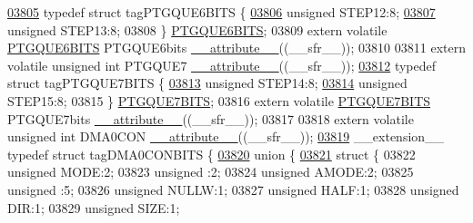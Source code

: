 \begin{DoxyCode}
\hypertarget{a00015_source_l03805}{}\hyperlink{a00014}{03805} \textcolor{keyword}{typedef} \textcolor{keyword}{struct }tagPTGQUE6BITS \{
\hypertarget{a00015_source_l03806}{}\hyperlink{a00014_af44a23d1cc0fa3fda040f9bff8cc19d1}{03806}   \textcolor{keywordtype}{unsigned} STEP12:8;
\hypertarget{a00015_source_l03807}{}\hyperlink{a00014_abdd685ca7ac89002c1130e1e0e8a37b9}{03807}   \textcolor{keywordtype}{unsigned} STEP13:8;
03808 \} \hyperlink{a00014_d5/d39/a00676}{PTGQUE6BITS};
03809 \textcolor{keyword}{extern} \textcolor{keyword}{volatile} \hyperlink{a00014_d5/d39/a00676}{PTGQUE6BITS} PTGQUE6bits \hyperlink{a00015_a493c46f03454991ccc5aa7a6e1dfb2a7}{\_\_attribute\_\_}((\_\_sfr\_\_));
03810 
03811 \textcolor{keyword}{extern} \textcolor{keyword}{volatile} \textcolor{keywordtype}{unsigned} \textcolor{keywordtype}{int}  PTGQUE7 \hyperlink{a00015_a493c46f03454991ccc5aa7a6e1dfb2a7}{\_\_attribute\_\_}((\_\_sfr\_\_));
\hypertarget{a00015_source_l03812}{}\hyperlink{a00014}{03812} \textcolor{keyword}{typedef} \textcolor{keyword}{struct }tagPTGQUE7BITS \{
\hypertarget{a00015_source_l03813}{}\hyperlink{a00014_a0e81977fa000fc2b0128943efe2fc72a}{03813}   \textcolor{keywordtype}{unsigned} STEP14:8;
\hypertarget{a00015_source_l03814}{}\hyperlink{a00014_a5d5ba25c4dd4a3183ec8fc7ed9a786fe}{03814}   \textcolor{keywordtype}{unsigned} STEP15:8;
03815 \} \hyperlink{a00014_dc/de4/a00677}{PTGQUE7BITS};
03816 \textcolor{keyword}{extern} \textcolor{keyword}{volatile} \hyperlink{a00014_dc/de4/a00677}{PTGQUE7BITS} PTGQUE7bits \hyperlink{a00015_a493c46f03454991ccc5aa7a6e1dfb2a7}{\_\_attribute\_\_}((\_\_sfr\_\_));
03817 
03818 \textcolor{keyword}{extern} \textcolor{keyword}{volatile} \textcolor{keywordtype}{unsigned} \textcolor{keywordtype}{int}  DMA0CON \hyperlink{a00015_a493c46f03454991ccc5aa7a6e1dfb2a7}{\_\_attribute\_\_}((\_\_sfr\_\_));
\hypertarget{a00015_source_l03819}{}\hyperlink{a00014}{03819} \_\_extension\_\_ \textcolor{keyword}{typedef} \textcolor{keyword}{struct }tagDMA0CONBITS \{
\hypertarget{a00015_source_l03820}{}\hyperlink{a00015}{03820}   \textcolor{keyword}{union }\{
\hypertarget{a00015_source_l03821}{}\hyperlink{a00015}{03821}     \textcolor{keyword}{struct }\{
03822       \textcolor{keywordtype}{unsigned} MODE:2;
03823       \textcolor{keywordtype}{unsigned} :2;
03824       \textcolor{keywordtype}{unsigned} AMODE:2;
03825       \textcolor{keywordtype}{unsigned} :5;
03826       \textcolor{keywordtype}{unsigned} NULLW:1;
03827       \textcolor{keywordtype}{unsigned} HALF:1;
03828       \textcolor{keywordtype}{unsigned} DIR:1;
03829       \textcolor{keywordtype}{unsigned} SIZE:1;

\end{DoxyCode}
